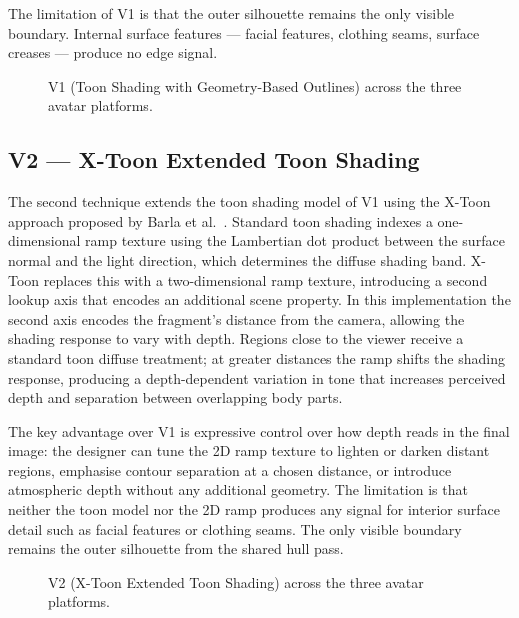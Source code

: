 The limitation of V1 is that the outer silhouette remains the only visible boundary. Internal surface features — facial features, clothing seams, surface creases — produce no edge signal.

\begin{figure}[H]
  \centering
  \caption{V1 (Toon Shading with Geometry-Based Outlines) across the three avatar platforms.}
  \label{fig:v1_platforms}
\end{figure}

\subsection{V2 — X-Toon Extended Toon Shading}
\label{sec:v2}

The second technique extends the toon shading model of V1 using the X-Toon approach proposed by Barla et al.~\cite{barla2006}. Standard toon shading indexes a one-dimensional ramp texture using the Lambertian dot product between the surface normal and the light direction, which determines the diffuse shading band. X-Toon replaces this with a two-dimensional ramp texture, introducing a second lookup axis that encodes an additional scene property. In this implementation the second axis encodes the fragment's distance from the camera, allowing the shading response to vary with depth. Regions close to the viewer receive a standard toon diffuse treatment; at greater distances the ramp shifts the shading response, producing a depth-dependent variation in tone that increases perceived depth and separation between overlapping body parts.

The key advantage over V1 is expressive control over how depth reads in the final image: the designer can tune the 2D ramp texture to lighten or darken distant regions, emphasise contour separation at a chosen distance, or introduce atmospheric depth without any additional geometry. The limitation is that neither the toon model nor the 2D ramp produces any signal for interior surface detail such as facial features or clothing seams. The only visible boundary remains the outer silhouette from the shared hull pass.

\begin{figure}[H]
  \centering
  \caption{V2 (X-Toon Extended Toon Shading) across the three avatar platforms.}
  \label{fig:v2_platforms}
\end{figure}

